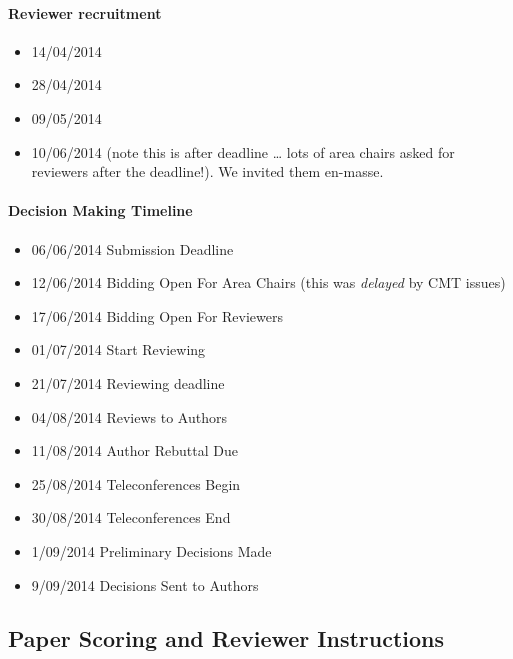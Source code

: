 \paragraph{Reviewer recruitment}

\begin{itemize}
\tightlist
\item
  14/04/2014
\item
  28/04/2014
\item
  09/05/2014
\item
  10/06/2014 (note this is after deadline \ldots{} lots of area chairs
  asked for reviewers after the deadline!). We invited them en-masse.
\end{itemize}

\paragraph{Decision Making Timeline}

\begin{itemize}
\tightlist
\item
  06/06/2014 Submission Deadline
\item
  12/06/2014 Bidding Open For Area Chairs (this was \emph{delayed} by
  CMT issues)
\item
  17/06/2014 Bidding Open For Reviewers
\item
  01/07/2014 Start Reviewing
\item
  21/07/2014 Reviewing deadline
\item
  04/08/2014 Reviews to Authors
\item
  11/08/2014 Author Rebuttal Due
\item
  25/08/2014 Teleconferences Begin
\item
  30/08/2014 Teleconferences End
\item
  1/09/2014 Preliminary Decisions Made
\item
  9/09/2014 Decisions Sent to Authors
\end{itemize}

\hypertarget{paper-scoring-and-reviewer-instructions}{%
\subsection{Paper Scoring and Reviewer
Instructions}\label{paper-scoring-and-reviewer-instructions}}

\begin{flushright}
\end{flushright}

